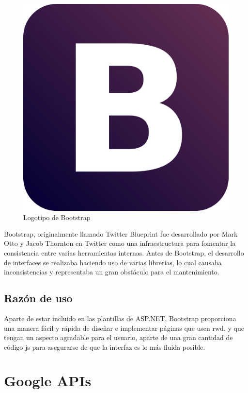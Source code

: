 \begin{figure}[!htbp]
	\centering
	\includegraphics[scale=0.10]{fig/bootstrap_logo}
	\caption{Logotipo de Bootstrap}
\end{figure}

\FloatBarrier

Bootstrap, originalmente llamado Twitter Blueprint fue desarrollado por Mark Otto y Jacob Thornton en Twitter como una infraestructura para fomentar la consistencia entre varias herramientas internas. Antes de Bootstrap, el desarrollo de interfaces se realizaba haciendo uso de varias librerías, lo cual causaba inconsistencias y representaba un gran obstáculo para el mantenimiento.

\subsection{Razón de uso}

Aparte de estar incluido en las plantillas de ASP.NET, Bootstrap proporciona una manera fácil y rápida de diseñar e implementar páginas que usen \acrfull{rwd}, y que tengan un aspecto agradable para el usuario, aparte de una gran cantidad de código \acrfull{js} para asegurarse de que la interfaz es lo más fluida posible.

\section{Google APIs}


